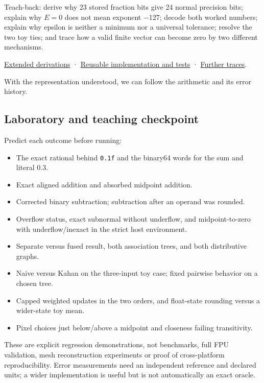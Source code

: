 Teach-back: derive why 23 stored fraction bits give 24 normal precision bits; explain why \(E=0\) does not mean exponent −127; decode both worked numbers; explain why epsilon is neither a minimum nor a universal tolerance; resolve the two toy ties; and trace how a valid finite vector can become zero by two different mechanisms.

\hyperref[01-foundations-i-ch011-m004---floating-point-fields-spacing-and-rounding]{Extended derivations} · \hyperref[appendix-4e2236f53445-m004---binary-interchange-inspection-and-strict-rounding-laboratory]{Reusable implementation and tests} · \hyperref[appendix-92ff77d4dfdc-m004---from-fields-to-values-and-failure-paths]{Further traces}.

With the representation understood, we can follow the arithmetic and its error history.

\subsection{Laboratory and teaching checkpoint}\label{01-foundations-i-ch001-laboratory-and-teaching-checkpoint}

Predict each outcome before running:

\begin{itemize}
\tightlist
\item
  The exact rational behind \texttt{0.1f} and the binary64 words for the sum and literal 0.3.
\item
  Exact aligned addition and absorbed midpoint addition.
\item
  Corrected binary subtraction; subtraction after an operand was rounded.
\item
  Overflow status, exact subnormal without underflow, and midpoint-to-zero with underflow/inexact in the strict host environment.
\item
  Separate versus fused result, both association trees, and both distributive graphs.
\item
  Naive versus Kahan on the three-input toy case; fixed pairwise behavior on a chosen tree.
\item
  Capped weighted updates in the two orders, and float-state rounding versus a wider-state toy mean.
\item
  Pixel choices just below/above a midpoint and closeness failing transitivity.
\end{itemize}

These are explicit regression demonstrations, not benchmarks, full FPU validation, mesh reconstruction experiments or proof of cross-platform reproducibility. Error measurements need an independent reference and declared units; a wider implementation is useful but is not automatically an exact oracle.

